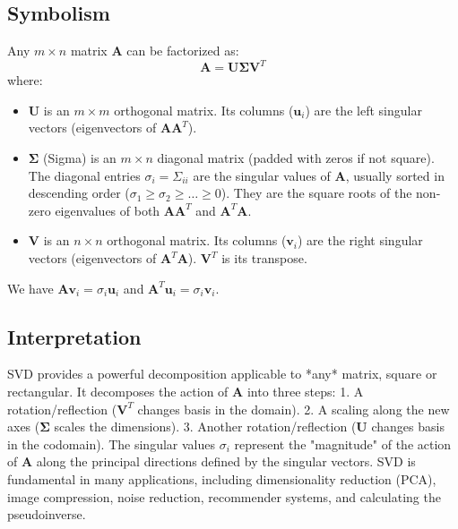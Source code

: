 \documentclass{article}
\newcommand{\vect}[1]{\bm{#1}} %
\newcommand{\mat}[1]{\bm{#1}}  %
\begin{document}
\subsection*{Symbolism}
Any $m \times n$ matrix $\mat{A}$ can be factorized as:
\[ \mat{A} = \mat{U} \mat{\Sigma} \mat{V}^T \]
where:
\begin{itemize}
    \item $\mat{U}$ is an $m \times m$ orthogonal matrix. Its columns ($\vect{u}_i$) are the left singular vectors (eigenvectors of $\mat{A}\mat{A}^T$).
    \item $\mat{\Sigma}$ (Sigma) is an $m \times n$ diagonal matrix (padded with zeros if not square). The diagonal entries $\sigma_i = \Sigma_{ii}$ are the singular values of $\mat{A}$, usually sorted in descending order ($\sigma_1 \ge \sigma_2 \ge \dots \ge 0$). They are the square roots of the non-zero eigenvalues of both $\mat{A}\mat{A}^T$ and $\mat{A}^T\mat{A}$.
    \item $\mat{V}$ is an $n \times n$ orthogonal matrix. Its columns ($\vect{v}_i$) are the right singular vectors (eigenvectors of $\mat{A}^T\mat{A}$). $\mat{V}^T$ is its transpose.
\end{itemize}
We have $\mat{A}\vect{v}_i = \sigma_i \vect{u}_i$ and $\mat{A}^T\vect{u}_i = \sigma_i \vect{v}_i$.

\subsection*{Interpretation}
SVD provides a powerful decomposition applicable to *any* matrix, square or rectangular. It decomposes the action of $\mat{A}$ into three steps:
1. A rotation/reflection ($\mat{V}^T$ changes basis in the domain).
2. A scaling along the new axes ($\mat{\Sigma}$ scales the dimensions).
3. Another rotation/reflection ($\mat{U}$ changes basis in the codomain).
The singular values $\sigma_i$ represent the "magnitude" of the action of $\mat{A}$ along the principal directions defined by the singular vectors. SVD is fundamental in many applications, including dimensionality reduction (PCA), image compression, noise reduction, recommender systems, and calculating the pseudoinverse.
\end{document}
